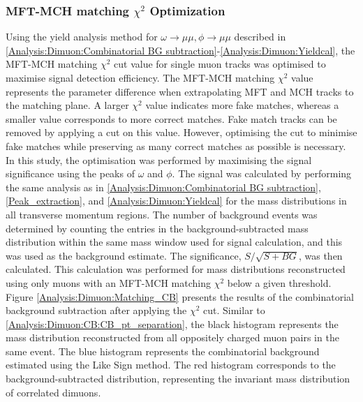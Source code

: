         \subsubsection{MFT-MCH matching $\chi^2$ Optimization}
        \label{matching_chi2_opt}
            Using the yield analysis method for \(\omega \rightarrow \mu\mu, \phi \rightarrow \mu\mu\) described in \ref{Analysis:Dimuon:Combinatorial BG subtraction}-\ref{Analysis:Dimuon:Yieldcal}, the MFT-MCH matching \(\chi^2\) cut value for single muon tracks was optimised to maximise signal detection efficiency. The MFT-MCH matching \(\chi^2\) value represents the parameter difference when extrapolating MFT and MCH tracks to the matching plane. A larger \(\chi^2\) value indicates more fake matches, whereas a smaller value corresponds to more correct matches. Fake match tracks can be removed by applying a cut on this value. However, optimising the cut to minimise fake matches while preserving as many correct matches as possible is necessary. In this study, the optimisation was performed by maximising the signal significance using the peaks of \(\omega\) and \(\phi\).
            The signal was calculated by performing the same analysis as in \ref{Analysis:Dimuon:Combinatorial BG subtraction}, \ref{Peak_extraction}, and \ref{Analysis:Dimuon:Yieldcal} for the mass distributions in all transverse momentum regions. The number of background events was determined by counting the entries in the background-subtracted mass distribution within the same mass window used for signal calculation, and this was used as the background estimate. The significance, \( S/\sqrt{S+BG} \), was then calculated. This calculation was performed for mass distributions reconstructed using only muons with an MFT-MCH matching \(\chi^2\) below a given threshold.  
            Figure \ref{Analysis:Dimuon:Matching_CB} presents the results of the combinatorial background subtraction after applying the \(\chi^2\) cut. Similar to \ref{Analysis:Dimuon:CB:CB_pt_separation}, the black histogram represents the mass distribution reconstructed from all oppositely charged muon pairs in the same event. The blue histogram represents the combinatorial background estimated using the Like Sign method. The red histogram corresponds to the background-subtracted distribution, representing the invariant mass distribution of correlated dimuons.

